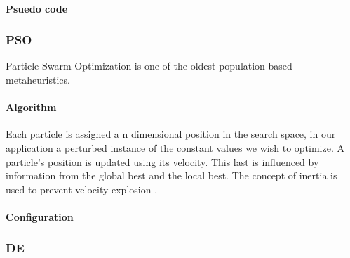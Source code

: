\paragraph{Psuedo code}
\subsubsection{PSO}
Particle Swarm Optimization \cite{PSO} is one of the oldest population based metaheuristics. 
\paragraph{Algorithm}
Each particle is assigned a n dimensional position in the search space, in our application a perturbed instance of the constant values we wish to optimize. A particle's position is updated using its velocity. This last is influenced by information from the global best and the local best. The concept of inertia is used to prevent velocity explosion \cite{PSOExplosion}.
\paragraph{Configuration}
\subsubsection{DE}
